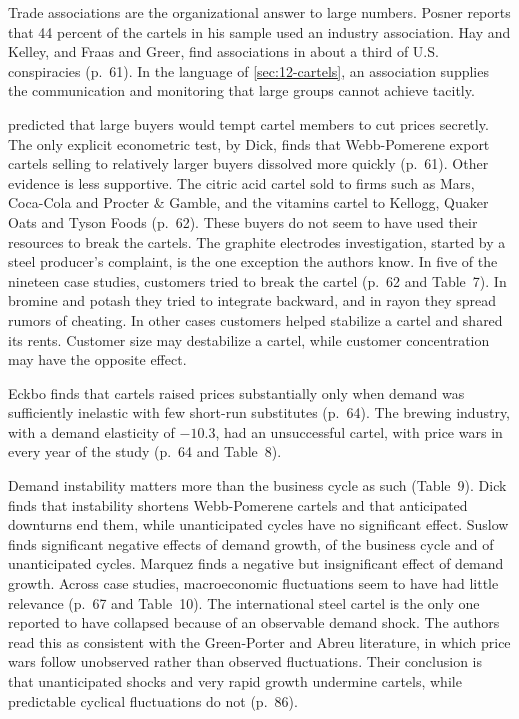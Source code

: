 Trade associations are the organizational answer to large numbers. Posner reports that 44 percent of the cartels in
his sample used an industry association. Hay and Kelley, and Fraas and Greer, find associations in about a third of
U.S. conspiracies (p.~61). In the language of \cref{sec:12-cartels}, an association supplies the communication and
monitoring that large groups cannot achieve tacitly.

\citet{Stigler1964} predicted that large buyers would tempt cartel members to cut prices secretly. The only explicit
econometric test, by Dick, finds that Webb-Pomerene export cartels selling to relatively larger buyers dissolved more
quickly (p.~61). Other evidence is less supportive. The citric acid cartel sold to firms such as Mars, Coca-Cola and
Procter \& Gamble, and the vitamins cartel to Kellogg, Quaker Oats and Tyson Foods (p.~62). These buyers do not seem to
have used their resources to break the cartels. The graphite electrodes investigation, started by a steel producer's
complaint, is the one exception the authors know. In five of the nineteen case studies, customers tried to break the
cartel (p.~62 and Table~7). In bromine and potash they tried to integrate backward, and in rayon they spread rumors of
cheating. In other cases customers helped stabilize a cartel and shared its rents. Customer size may destabilize a
cartel, while customer concentration may have the opposite effect.

Eckbo finds that cartels raised prices substantially only when demand was sufficiently inelastic with few short-run
substitutes (p.~64). The brewing industry, with a demand elasticity of $-10.3$, had an unsuccessful cartel,
with price wars in every year of the study (p.~64 and Table~8).

Demand instability matters more than the business cycle as such (Table~9). Dick finds that instability shortens
Webb-Pomerene cartels and that anticipated downturns end them, while unanticipated cycles have no significant
effect. Suslow finds significant negative effects of demand growth, of the business cycle and of unanticipated cycles.
Marquez finds a negative but insignificant effect of demand growth. Across case studies, macroeconomic fluctuations
seem to have had little relevance (p.~67 and Table~10). The international steel cartel is the only one reported to
have collapsed because of an observable demand shock. The authors read this as consistent with the Green-Porter and
Abreu literature, in which price wars follow unobserved rather than observed fluctuations. Their conclusion is that
unanticipated shocks and very rapid growth undermine cartels, while predictable cyclical fluctuations do not (p.~86).

